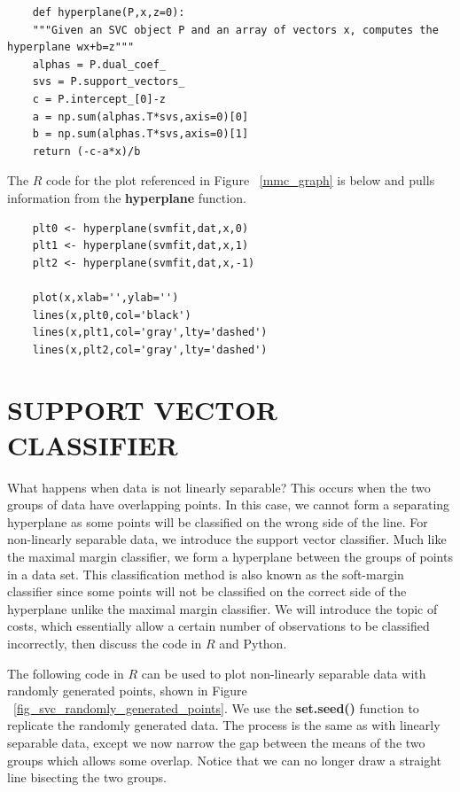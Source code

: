\documentclass[12pt]{article}
\begin{document}
\begin{verbatim}
    def hyperplane(P,x,z=0):
    """Given an SVC object P and an array of vectors x, computes the hyperplane wx+b=z"""
    alphas = P.dual_coef_
    svs = P.support_vectors_
    c = P.intercept_[0]-z
    a = np.sum(alphas.T*svs,axis=0)[0]
    b = np.sum(alphas.T*svs,axis=0)[1]
    return (-c-a*x)/b
\end{verbatim}

The $R$ code for the plot referenced in Figure ~\ref{mmc_graph} is below and pulls information from the \textbf{hyperplane} function.

\begin{verbatim}
    plt0 <- hyperplane(svmfit,dat,x,0)
    plt1 <- hyperplane(svmfit,dat,x,1)
    plt2 <- hyperplane(svmfit,dat,x,-1)
    
    plot(x,xlab='',ylab='')
    lines(x,plt0,col='black')
    lines(x,plt1,col='gray',lty='dashed')
    lines(x,plt2,col='gray',lty='dashed')
\end{verbatim}

\section{SUPPORT VECTOR CLASSIFIER}

What happens when data is not linearly separable? This occurs when the two groups of data have overlapping points. In this case, we cannot form a separating hyperplane as some points will be classified on the wrong side of the line. For non-linearly separable data, we introduce the support vector classifier. Much like the maximal margin classifier, we form a hyperplane between the groups of points in a data set. This classification method is also known as the soft-margin classifier since some points will not be classified on the correct side of the hyperplane unlike the maximal margin classifier. We will introduce the topic of costs, which essentially allow a certain number of observations to be classified incorrectly, then discuss the code in $R$ and Python.

The following code in $R$ can be used to plot non-linearly separable data with randomly generated points, shown in Figure ~\ref{fig_svc_randomly_generated_points}. We use the \textbf{set.seed()} function to replicate the randomly generated data. The process is the same as with linearly separable data, except we now narrow the gap between the means of the two groups which allows some overlap. Notice that we can no longer draw a straight line bisecting the two groups.
\end{document}
